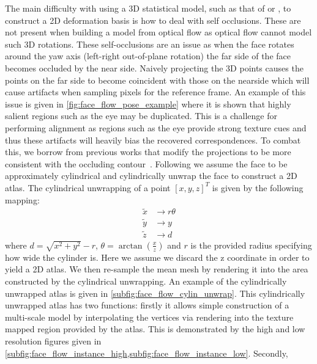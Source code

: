 The main difficulty with using a 3D statistical model, such as that of
\citet{paysan20093d} or \citet{booth2016lsfm}, to construct a 2D
deformation basis is how to deal with self occlusions. These are not present when
building a model from optical flow as optical flow cannot model such 3D rotations.
These self-occlusions are an issue as when the face rotates around the yaw axis 
(left-right out-of-plane rotation) the far side of the face becomes occluded
by the near side. Naively projecting the 3D points causes the points on the far
side to become coincident with those on the nearside which will cause artifacts
when sampling pixels for the reference frame. An example of this issue
is given in \cref{fig:face_flow_pose_example} where it is shown that highly
salient regions such as the eye may be duplicated. This is a challenge for 
performing alignment as regions such as the eye provide strong texture cues and
thus these artifacts will heavily bias the recovered correspondences. To combat
this, we borrow from previous works that modify the projections to be more
consistent with the occluding contour~\cite{Zhu:2015ur,zhu2015high,hassner2015effective}.
Following \citet{zhu2015high} we assume the face to be approximately cylindrical and
cylindrically unwrap the face to construct a 2D atlas. The cylindrical unwrapping
of a point ${[x, y, z]}^T$ is given by the following mapping:
\begin{equation}
    \begin{aligned}
        \tilde{x} &\rightarrow r \theta \\
        \tilde{y} &\rightarrow y \\
        \tilde{z} &\rightarrow d
    \end{aligned}
\end{equation}
where $d = \sqrt{x^2 + y^2} - r$,
$\theta = \arctan{\left(\frac{x}{z}\right)}$ and $r$ is the provided radius 
specifying how wide the cylinder is. Here we assume we discard the z
coordinate in order to yield a 2D atlas.
We then re-sample the mean mesh by rendering it into the area constructed by the
cylindrical unwrapping. An example of the cylindrically unwrapped atlas is given
in \cref{subfig:face_flow_cylin_unwrap}. 
This cylindrically unwrapped atlas has two functions: firstly it
allows simple construction of a multi-scale model by interpolating the vertices 
via rendering into the texture mapped region provided by the atlas. 
This is demonstrated by the high
and low resolution figures given in 
\cref{subfig:face_flow_instance_high,subfig:face_flow_instance_low}. Secondly,
